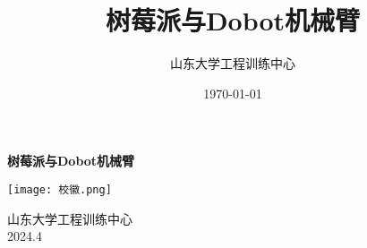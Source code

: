 \documentclass[11pt,a4paper]{report}
\title{树莓派与Dobot机械臂}
\author{山东大学工程训练中心}
\date{\today}
\begin{document}
	\begin{titlepage}
		\centering
		\vspace*{1cm}  %
		
		\Huge
		\textbf{树莓派与Dobot机械臂}
		
		\vspace{0.5cm}

		
		\vspace{1.5cm}
		
		\texttt{[image: 校徽.png]}  %
		
		\vfill
		
		\Large
		山东大学工程训练中心\\
		\Large
		2024.4
		
	\end{titlepage}
	\tableofcontents  %
	
	
	
\end{document}
